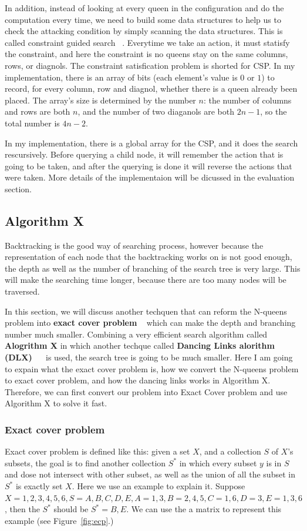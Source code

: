 In addition, instead of looking at every queen in the configuration and do the computation every time, we need to build some data structures to help us to check the attacking condition by simply scanning the data structures. This is called constraint guided search ~\cite{russell_modern_1995}. Everytime we take an action, it must statisfy the constraint, and here the constraint is no queens stay on the same columns, rows, or diagnols. The constraint satisfication problem is shorted for CSP. In my implementation, there is an array of bits (each element's value is $0$ or $1$) to record, for every column, row and diagnol, whether there is a queen already been placed. The array's size is determined by the number $n$: the number of columns and rows are both $n$, and the number of two diaganols are both $2n-1$, so the total number is $4n-2$.

In my implementation, there is a global array for the CSP, and it does the search rescursively. Before querying a child node, it will remember the action that is going to be taken, and after  the querying is done it will reverse the actions that were taken. More details of the implementaion will be dicussed in the evaluation section. 

\subsection{Algorithm X}
Backtracking is the good way of searching process, however because the representation of each node that the backtracking works on is not good enough, the depth as well as the number of branching of the search tree is very large. This will make the searching time longer, because there are too many nodes will be traversed.

In this section, we will discuss another techquen that can reform the N-queens problem into \textbf{exact cover problem} ~\cite{noauthor_exact_2017} which can make the depth and branching number much smaller. Combining a very efficient search algorithm called \textbf{Alogrithm X}  in which another techque called \textbf{Dancing Links alorithm (DLX)} ~\cite{noauthor_knuths_2016}~\cite{knuth_dancing_2000} is used, the search tree is going to be much smaller. Here I am going to expain what the exact cover problem is, how we convert the N-queens problem to exact cover problem, and how the dancing links works in Algorithm X. Therefore, we can first convert our problem into Exact Cover problem and use Algorithm X to solve it fast.

\subsubsection{Exact cover problem}
Exact cover problem is defined like this: given a set $X$, and a collection $S$ of $X$'s subsets, the goal is to find another collection $S^*$ in which every subset $y$ is in $S$ and dose not intersect with other subset, as well as the union of all the subset in $S^*$ is exactly set $X$. Here we use an example to explain it. Suppose $X={1,2,3,4,5,6}, S={A, B, C, D, E}, A={1,3}, B={2,4, 5}, C={1, 6}, D={3},E={1, 3, 6}$, then the $S^*$ should be $S^*={B, E}$. We can use the a matrix to represent this example (see Figure~\ref{fig:ecp}.)

